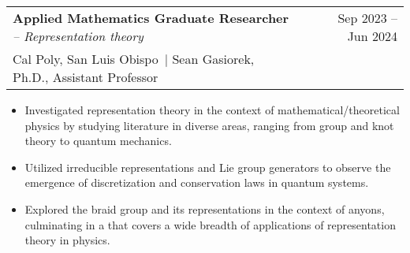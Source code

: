 \documentclass[a4paper,11pt]{article}
\makeatletter
\newcommand{\colhref}[3]{\href{#2}{\color{#1}{#3}}} %
\newenvironment{jobcustomlong}[4]
    {
    \begin{tabularx}{\linewidth}{@{}l X r@{}}
    \textbf{#1} \textit{#2} & \hfill &  #3 \\[-2.5pt]
    \textcolor{black!55!white}{\small #4} \\[2.5pt]
    \end{tabularx}
    \begin{minipage}[t]{\linewidth}
    \begin{itemize}[nosep,after=\strut, leftmargin=1.75em, itemsep=1pt,label={\small$\bullet$}]
    }
    {
    \end{itemize} \vspace{.325em}
    \end{minipage}   
    }
\newcommand{\calpoly}{\textcolor{black!55!white}{Cal Poly, San Luis Obispo}}
\makeatother
\begin{document}
\begin{jobcustomlong}{Applied Mathematics Graduate Researcher}{-- Representation theory}{Sep 2023 -- Jun 2024}{\calpoly\ $\vert$ Sean Gasiorek, Ph.D., Assistant Professor}
    \item Investigated representation theory in the context of mathematical/theoretical physics by studying literature in diverse areas, ranging from group and knot theory to quantum mechanics.
    \item Utilized irreducible representations and Lie group generators to observe the emergence of discretization and conservation laws in quantum systems.
    \item Explored the braid group and its representations in the context of anyons, culminating in a \colhref{blue!65!black}{https://digitalcommons.calpoly.edu/theses/2844/}{master's thesis} that covers a wide breadth of applications of representation theory in physics.
\end{jobcustomlong}
\end{document}
